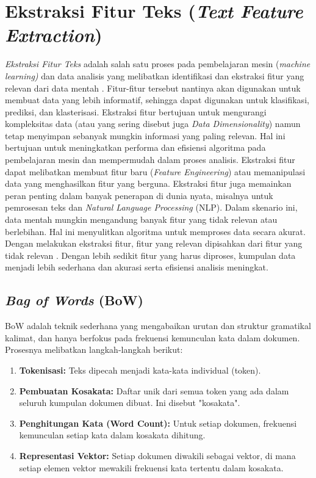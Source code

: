 \section{Ekstraksi Fitur Teks (\textit{Text Feature Extraction})}
\textit{Ekstraksi Fitur Teks} adalah salah satu proses pada pembelajaran mesin (\textit{machine learning)} dan data analisis yang melibatkan identifikasi dan ekstraksi fitur yang relevan dari data mentah \cite{vijayakumarFusionBasedFeature2021}. Fitur-fitur tersebut nantinya akan digunakan untuk membuat data yang lebih informatif, sehingga dapat digunakan untuk klasifikasi, prediksi, dan klasterisasi. Ekstraksi fitur bertujuan untuk mengurangi kompleksitas data (atau yang sering disebut juga \textit{Data Dimensionality}) namun tetap menyimpan sebanyak mungkin informasi yang paling relevan. Hal ini bertujuan untuk meningkatkan performa dan efisiensi algoritma pada pembelajaran mesin dan mempermudah dalam proses analisis. Ekstraksi fitur dapat melibatkan membuat fitur baru (\textit{Feature Engineering}) atau memanipulasi data yang menghasilkan fitur yang berguna.
Ekstraksi fitur juga memainkan peran penting dalam banyak penerapan di dunia nyata, misalnya untuk pemrosesan teks dan \textit{Natural Language Processing} (NLP). Dalam skenario ini, data mentah mungkin mengandung banyak fitur yang tidak relevan atau berlebihan. Hal ini menyulitkan algoritma untuk memproses data secara akurat. Dengan melakukan ekstraksi fitur, fitur yang relevan dipisahkan dari fitur yang tidak relevan \cite{shakerFeatureExtractionBased2022}. Dengan lebih sedikit fitur yang harus diproses, kumpulan data menjadi lebih sederhana dan akurasi serta efisiensi analisis meningkat.

\subsection{\textit{Bag of Words} (BoW)}
BoW adalah teknik sederhana yang mengabaikan urutan dan struktur gramatikal kalimat, dan hanya berfokus pada frekuensi kemunculan kata dalam dokumen. Prosesnya melibatkan langkah-langkah berikut:

\begin{enumerate}
    \item \textbf{Tokenisasi:} Teks dipecah menjadi kata-kata individual (token).
    \item \textbf{Pembuatan Kosakata:} Daftar unik dari semua token yang ada dalam seluruh kumpulan dokumen dibuat. Ini disebut "kosakata".
    \item \textbf{Penghitungan Kata (Word Count): } Untuk setiap dokumen, frekuensi kemunculan setiap kata dalam kosakata dihitung. 
    \item \textbf{Representasi Vektor:} Setiap dokumen diwakili sebagai vektor, di mana setiap elemen vektor mewakili frekuensi kata tertentu dalam kosakata.
\end{enumerate}

